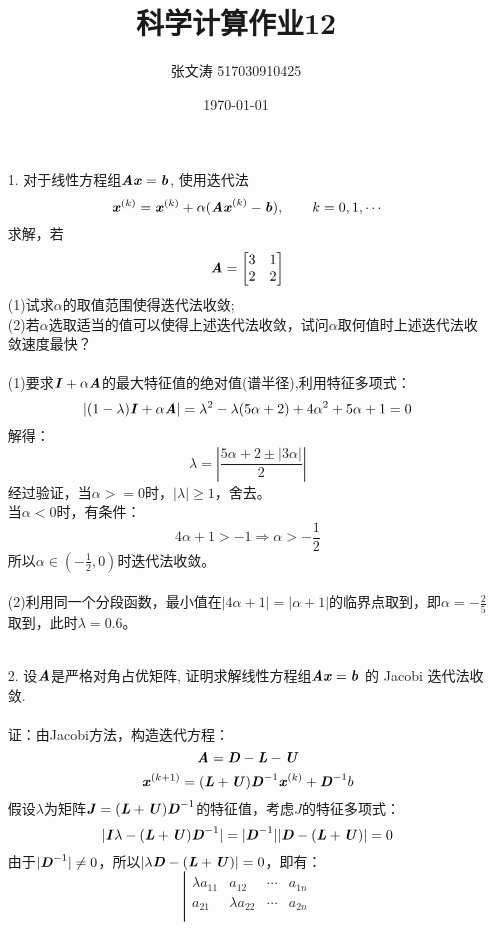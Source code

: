\documentclass{article}
\title{科学计算作业12}
\author{张文涛 517030910425}
\date{\today}
\newcommand{\xc}[1]{\textbf{\emph{#1}}}
\begin{document}
	\maketitle
	\begin{itemize}
		\item[1.]对于线性方程组$\xc{Ax} = \xc{b}$, 使用迭代法
		$$
			\xc{x}^{(k)} = \xc{x}^{(k)} + \alpha(\xc{Ax}^{(k)} - \xc{b}),\qquad  k = 0,1,\cdots 
		$$
		求解，若
		$$
			\xc{A} = \begin{bmatrix}
				3 & 1 \\
				2 & 2
			\end{bmatrix}
		$$
		(1)试求$\alpha$的取值范围使得迭代法收敛;\\
		(2)若$\alpha$选取适当的值可以使得上述迭代法收敛，试问$\alpha$取何值时上述迭代法收敛速度最快？\\
		\\
		(1)要求$\xc{I} + \alpha\xc{A}$的最大特征值的绝对值(谱半径),利用特征多项式：
		$$
			|(1 - \lambda)\xc{I} + \alpha\xc{A}| = \lambda^2 - \lambda(5\alpha + 2) + 4\alpha^2 + 5\alpha + 1 = 0
		$$
		解得：
		$$
			\lambda = \left|\frac{5\alpha + 2 \pm |3\alpha|}{2}\right|
		$$
		经过验证，当$\alpha >= 0$时，$|\lambda| \ge 1$，舍去。\\
		当$\alpha < 0$时，有条件：
		$$
			4\alpha + 1 > -1 \Rightarrow \alpha > -\frac{1}{2}
		$$
		所以$\alpha \in (-\frac{1}{2}, 0)$时迭代法收敛。\\
		\\
		(2)利用同一个分段函数，最小值在$|4\alpha +1| = |\alpha + 1|$的临界点取到，即$\alpha = -\frac{2}{5}$取到，此时$\lambda = 0.6$。\\
		\\
		\item [2.]设$\xc{A}$是严格对角占优矩阵, 证明求解线性方程组$\xc{Ax} = \xc{b}$ 的 Jacobi 迭代法收敛.\\
		\\
		证：由Jacobi方法，构造迭代方程：
		$$	
			\xc{A} = \xc{D} -\xc{L} -\xc{U}
		$$
		$$
			\xc{x}^{(k+1)} = (\xc{L}+\xc{U})\xc{D}^{-1}\xc{x}^{(k)} + \xc{D}^{-1}b
		$$
		假设$\lambda$为矩阵$\xc{J} = (\xc{L}+\xc{U})\xc{D}^{-1}$的特征值，考虑$J$的特征多项式：
		$$
			|\xc{I}\lambda - (\xc{L}+\xc{U})\xc{D}^{-1}| = |\xc{D}^{-1}||\xc{D} - (\xc{L} + \xc{U})| = 0
		$$
		由于$|\xc{D}^{-1}| \ne 0$，所以$|\lambda\xc{D} - (\xc{L} + \xc{U})| = 0$，即有：
		$$
			\left|
			\begin{array}{cccc}
			\lambda a_{11} & a_{12} & \cdots & a_{1n}\\
			a_{21} & \lambda a_{22} & \cdots & a_{2n}\\

\end{array}$$
\end{itemize}
\end{document}
